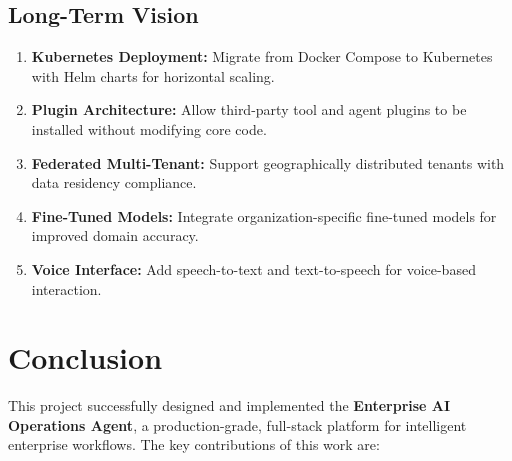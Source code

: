 \documentclass[12pt, a4paper]{report}
\begin{document}
\section{Long-Term Vision}

\begin{enumerate}
    \item \textbf{Kubernetes Deployment:} Migrate from Docker Compose to Kubernetes with Helm charts for horizontal scaling.
    \item \textbf{Plugin Architecture:} Allow third-party tool and agent plugins to be installed without modifying core code.
    \item \textbf{Federated Multi-Tenant:} Support geographically distributed tenants with data residency compliance.
    \item \textbf{Fine-Tuned Models:} Integrate organization-specific fine-tuned models for improved domain accuracy.
    \item \textbf{Voice Interface:} Add speech-to-text and text-to-speech for voice-based interaction.
\end{enumerate}

\chapter{Conclusion}

This project successfully designed and implemented the \textbf{Enterprise AI Operations Agent}, a production-grade, full-stack platform for intelligent enterprise workflows. The key contributions of this work are:
\end{document}
